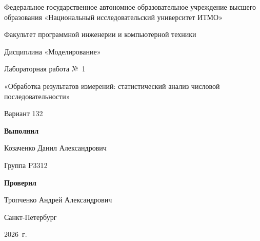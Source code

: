 \begin{titlepage}
  \centering
  Федеральное государственное автономное образовательное учреждение высшего
  образования «Национальный исследовательский университет ИТМО»\par
  \vspace{1cm}
  Факультет программной инженерии и компьютерной техники\par
  \vfill
  {\large Дисциплина «Моделирование»\par}
  \vspace{0.5cm}
  Лабораторная работа №~1\par
  «Обработка результатов измерений: статистический анализ числовой последовательности»\par
  Вариант 132\par
  \vfill
  \begin{flushright}
    \textbf{Выполнил}\par
    Козаченко Данил Александрович\par
    Группа P3312\par
    \medskip
    \textbf{Проверил}\par
    Тропченко Андрей Александрович
  \end{flushright}
  \vspace{2cm}
  Санкт-Петербург\par
  2026~г.
\end{titlepage}
